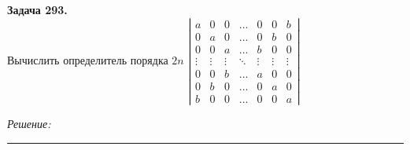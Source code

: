 \documentclass[a4paper, 12pt]{article}
\newenvironment{problem}[2][Задача]
    { \begin{mdframed}[backgroundcolor=gray!10] \textbf{#1 #2.} \\}
    {  \end{mdframed}}
\newenvironment{solution}
    {\textit{Решение: }}
    {\noindent\rule{7in}{1.5pt}}
\begin{document}
\begin{problem}{293}
Вычислить определитель порядка $2n$
$\left| \begin{array}{rrrrrrr}a & 0 & 0 & \ldots & 0 & 0 & b\\ 0 & a & 0 & \ldots & 0 & b & 0 \\ 0 & 0 & a & \ldots & b & 0 & 0 \\ \vdots & \vdots & \vdots & \ddots & \vdots & \vdots & \vdots \\ 0 & 0 & b & \ldots & a & 0 & 0 \\ 0 & b & 0 & \ldots & 0 & a & 0 \\ b & 0 & 0 & \ldots & 0 & 0 & a \end{array} \right|$
\end{problem}
\begin{solution}


\end{solution}
\end{document}

